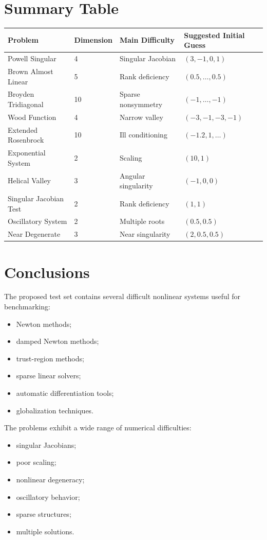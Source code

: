 \documentclass[11pt,a4paper]{article}
\begin{document}
\section{Summary Table}

\begin{center}
\begin{longtable}{llll}
\toprule
Problem & Dimension & Main Difficulty & Suggested Initial Guess \\
\midrule
Powell Singular & 4 & Singular Jacobian & $(3,-1,0,1)$ \\
Brown Almost Linear & 5 & Rank deficiency & $(0.5,\dots,0.5)$ \\
Broyden Tridiagonal & 10 & Sparse nonsymmetry & $(-1,\dots,-1)$ \\
Wood Function & 4 & Narrow valley & $(-3,-1,-3,-1)$ \\
Extended Rosenbrock & 10 & Ill conditioning & $(-1.2,1,\dots)$ \\
Exponential System & 2 & Scaling & $(10,1)$ \\
Helical Valley & 3 & Angular singularity & $(-1,0,0)$ \\
Singular Jacobian Test & 2 & Rank deficiency & $(1,1)$ \\
Oscillatory System & 2 & Multiple roots & $(0.5,0.5)$ \\
Near Degenerate & 3 & Near singularity & $(2,0.5,0.5)$ \\
\bottomrule
\end{longtable}
\end{center}

\section{Conclusions}

The proposed test set contains several difficult nonlinear systems useful for benchmarking:

\begin{itemize}
  \item Newton methods;
  \item damped Newton methods;
  \item trust-region methods;
  \item sparse linear solvers;
  \item automatic differentiation tools;
  \item globalization techniques.
\end{itemize}

The problems exhibit a wide range of numerical difficulties:
\begin{itemize}
  \item singular Jacobians;
  \item poor scaling;
  \item nonlinear degeneracy;
  \item oscillatory behavior;
  \item sparse structures;
  \item multiple solutions.
\end{itemize}
\end{document}
